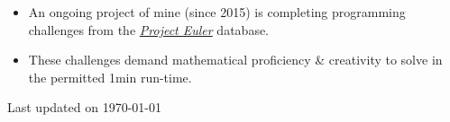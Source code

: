 \documentclass[10pt,a4paper,ragged2e,withhyper]{altacv}
\newcommand{\updateinfo}[1][\today]{\par\vfill\hfill{\scriptsize\color{LightGrey}Last updated on #1}}
\begin{document}
\begin{paracol}{2}
\begin{itemize}
\item An ongoing project of mine (since 2015) is completing programming challenges from the
	\href{https://projecteuler.net/about}{\emph{Project Euler}} database.
\item These challenges demand mathematical proficiency \& creativity to solve in the permitted 1min run-time.
\end{itemize}

\end{paracol}
\updateinfo
\end{document}
